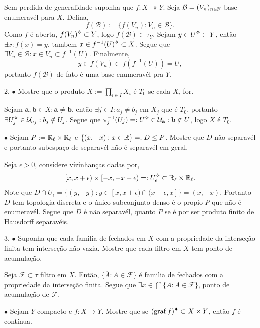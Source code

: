 \textcolor{gris}{Sem perdida de generalidade suponha que \(f : X \twoheadrightarrow Y\). Seja \(\mathcal{B}= (V_n)_{n\in\mathbb{N}}\) base enumeravél para \(X\). Defina, 
\[f(\mathcal{B}) := \{f(V_n) : V_n \in \mathcal{B}\}. \]
Como \(f \) é aberta, \(f(V_n)\ab\subset Y\), logo \(f(\mathcal{B}) \subset \tau_Y\). Sejam \(y \in U\ab \subset Y\), então \(\exists x : f(x) = y\), tambem \(x \in f^{-1} (U)\ab \subset X\). Segue que \(\exists V_n \in \mathcal{B} : x \in V_n \subset f^{-1}(U)\). Finalmente, 
\[y \in f(V_n) \subset f(f^{-1}(U)) = U, \]  
portanto \(f(\mathcal{B})\) de fato é uma base enumeravél pra \(Y\). 
} 

2. \(\bullet\) Mostre que o produto \(X := \underset{i\in I}{\prod} X_i\) é \(T_0\) se cada \(X_i\) for. 

\textcolor{gris}{Sejam \(\textbf{a}, \textbf{b} \in X : \textbf{a} \neq \textbf{b}\), então \(\exists j\in I : a_j \neq b_j \)  em \( X_j\) que é \(T_0\), portanto \(\exists U_j\ab \in \U_{a_j} : b_j \notin U_j\). Segue que \(\pi_j^{-1} (U_j) =: U\ab \in \U_\textbf{a} : \textbf{b} \notin U\), logo \(X\) é \(T_0\). } 

\(\bullet\) Sejam \(P:= \mathbb{R}_\ell \times \mathbb{R}_\ell\) e \(\{(x,-x) : x \in \mathbb{R}\} =: D \leq P\). Mostre que \(D\) não separavél e portanto subespaço de separavél não é separavél em geral.  

\textcolor{gris}{Seja \(\epsilon > 0\), considere vizinhanças dadas por,  
\[[x, x+\epsilon) \times [-x, -x + \epsilon) =: U_\epsilon\ab \subset \R_\ell \times \R_\ell .\]
Note que \( D \cap U_\epsilon = \{(y,-y) : y \in [x, x+\epsilon) \cap (x-\epsilon, x]\} = (x, -x) \). Portanto \(D\) tem topologia discreta e o único subconjunto denso é o propio \(P\) que não é enumeravél. Segue que \(D\) é não separavél, quanto \(P\) se é por ser produto finito de Hausdorff separavéis.  
}   

3. \(\bullet\) Suponha que cada familia de fechados em \(X\) com a propriedade da interseção finita tem interseção não vazia. Mostre que cada filtro em \(X\) tem ponto de acumulação.  

\textcolor{gris}{Seja \(\mathcal{F}\subset \tau\) filtro em \(X\). Então, \(\{\overline{A} : A \in \mathcal{F}\} \) é familia de fechados com a propriedade da interseção finita. Segue que \(\exists x \in \bigcap \{\overline{A}: A \in \mathcal{F}\}\), ponto de acumulação de \(\mathcal{F}\). }  

\(\bullet\) Sejam \(Y\) compacto e \(f:X\to Y\). Mostre que se \((\operatorname{graf}f)\ce \subset X\times Y\), então \(f \) é contínua.  

